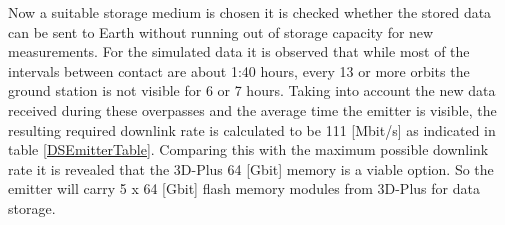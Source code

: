 Now a suitable storage medium is chosen it is checked whether the stored data can be sent to Earth without running out of storage capacity for new measurements. For the simulated data it is observed that while most of the intervals between contact are about 1:40 hours, every 13 or more orbits the ground station is not visible for 6 or 7 hours. Taking into account the new data received during these overpasses and the average time the emitter is visible, the resulting required downlink rate is calculated to be 111 [Mbit/s] as indicated in table \ref{DSEmitterTable}. Comparing this with the maximum possible downlink rate it is revealed that the 3D-Plus 64 [Gbit] memory is a viable option. So the emitter will carry 5 x 64 [Gbit] flash memory modules from 3D-Plus for data storage.